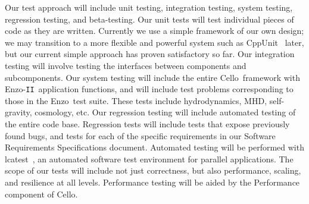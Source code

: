 \documentclass[11pt,letterpaper]{article}
\newcommand{\cello}{\textsf{Cello}}
\newcommand{\enzo}{\textsf{Enzo}}
\newcommand{\enzoii}{\textsf{Enzo}-\texttt{II}}
\newcommand{\lcatest}{\textsf{lcatest}}
\newcommand{\code}[1]{\textsf{#1}}
\begin{document}
Our test approach will include unit testing, integration testing,
system testing, regression testing, and beta-testing.  Our unit tests
will test individual pieces of code as they are written.  Currently we
use a simple framework of our own design; we may transition to a more
flexible and powerful system such as CppUnit~\cite{wwwcppunit} later,
but our current simple approach has proven satisfactory so far.  Our
integration testing will involve testing the interfaces between
components and subcomponents.  Our system testing will include the
entire \cello\ framework with \enzoii\ application functions, and will
include test problems corresponding to those in the \enzo\ test suite.
These tests include hydrodynamics, MHD, self-gravity, cosmology, etc.
Our regression testing will include automated testing of the entire
code base.  Regression tests will include tests that expose previously
found bugs, and tests for each of the specific requirements in our
Software Requirements Specifications document.  Automated testing will
be performed with \lcatest~\cite{wwwlcatest}, an automated software
test environment for parallel applications.
The scope of our tests will include not just correctness, but also
performance, scaling, and resilience at all levels.  Performance
testing will be aided by the \code{Performance} component of \cello.

\end{document}
